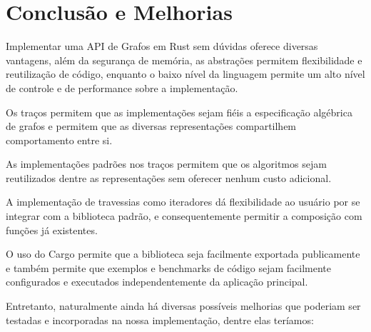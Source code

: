\chapter{Conclusão e Melhorias}
\label{ch:conclusão}

Implementar uma API de Grafos em Rust sem dúvidas oferece diversas
vantagens, além da segurança de memória, as abstrações permitem
flexibilidade e reutilização de código, enquanto o baixo nível da
linguagem permite um alto nível de controle e de performance sobre a
implementação.

Os traços permitem que as implementações sejam fiéis a especificação
algébrica de grafos e permitem que as diversas representações
compartilhem comportamento entre si.

As implementações padrões nos traços permitem que
os algoritmos sejam reutilizados dentre as representações sem
oferecer nenhum custo adicional.

A implementação de travessias como iteradores dá flexibilidade
ao usuário por se integrar com a biblioteca padrão, e consequentemente
permitir a composição com funções já existentes.

O uso do Cargo permite que a biblioteca seja facilmente exportada
publicamente e também permite que exemplos e benchmarks de código
sejam facilmente configurados e executados independentemente da
aplicação principal.

Entretanto, naturalmente ainda há diversas possíveis melhorias que
poderiam ser testadas e incorporadas na nossa implementação, dentre
elas teríamos:

